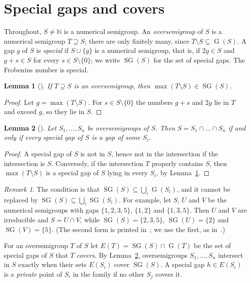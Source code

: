 \documentclass[11pt]{article}
\newtheorem{lemma}{Lemma}
\theoremstyle{definition}
\theoremstyle{remark}
\newtheorem{remark}{Remark}
\newcommand{\N}{\mathbb N}
\DeclareMathOperator{\SG}{SG}
\DeclareMathOperator{\G}{G}
\begin{document}
\section{Special gaps and covers}\label{sec:prelim}

Throughout, $S\ne\N$ is a numerical semigroup. An \emph{oversemigroup} of $S$
is a numerical semigroup $T\supseteq S$; there are only finitely many, since
$T\setminus S\subseteq\G(S)$. A gap $g$ of $S$ is \emph{special} if
$S\cup\{g\}$ is a numerical semigroup, that is, if $2g\in S$ and $g+s\in S$
for every $s\in S\setminus\{0\}$; we write $\SG(S)$ for the set of special
gaps. The Frobenius number is special.

\begin{lemma}[{\cite[Chapter~3, Lemma~4.35]{rg}}]\label{lem:max}
If $T\supsetneq S$ is an oversemigroup, then $\max(T\setminus S)\in\SG(S)$.
\end{lemma}

\begin{proof}
Let $g=\max(T\setminus S)$. For $s\in S\setminus\{0\}$ the numbers $g+s$ and
$2g$ lie in $T$ and exceed $g$, so they lie in $S$.
\end{proof}

\begin{lemma}[{\cite[Chapter~3, Proposition~4.48]{rg}}]\label{lem:cover}
Let $S_1,\dots,S_n$ be oversemigroups of $S$. Then $S=S_1\cap\dots\cap S_n$
if and only if every special gap of $S$ is a gap of some $S_i$.
\end{lemma}

\begin{proof}
A special gap of $S$ is not in $S$, hence not in the intersection if the
intersection is $S$. Conversely, if the intersection $T$ properly contains $S$,
then $\max(T\setminus S)$ is a special gap of $S$ lying in every $S_i$, by
Lemma~\ref{lem:max}.
\end{proof}

\begin{remark}\label{rem:sg}
The condition is that $\SG(S)\subseteq\bigcup_i\G(S_i)$, and it cannot be
replaced by $\SG(S)\subseteq\bigcup_i\SG(S_i)$. For example, let $S$, $U$ and
$V$ be the numerical semigroups with gaps $\{1,2,3,5\}$, $\{1,2\}$ and
$\{1,3,5\}$. Then $U$ and $V$ are irreducible and $S=U\cap V$, while
$\SG(S)=\{2,3,5\}$, $\SG(U)=\{2\}$ and $\SG(V)=\{5\}$. (The second form is
printed in~\cite[(2.5)]{go}; we use the first, as in~\cite{rg}.)
\end{remark}

For an oversemigroup $T$ of $S$ let $E(T)=\SG(S)\cap\G(T)$ be the set of
special gaps of $S$ that $T$ \emph{covers}. By Lemma~\ref{lem:cover},
oversemigroups $S_1,\dots,S_n$ intersect in $S$ exactly when their sets
$E(S_i)$ cover $\SG(S)$. A special gap $h\in E(S_i)$ is a \emph{private}
point of $S_i$ in the family if no other $S_j$ covers it.
\end{document}
